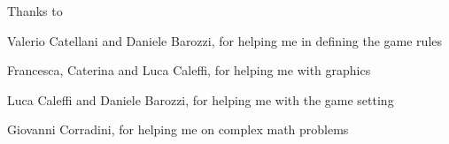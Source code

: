 \ringraziamenti
Thanks to

Valerio Catellani and Daniele Barozzi, for helping me in defining the game rules

Francesca, Caterina and Luca Caleffi, for helping me with graphics

Luca Caleffi and Daniele Barozzi, for helping me with the game setting

Giovanni Corradini, for helping me on complex math problems